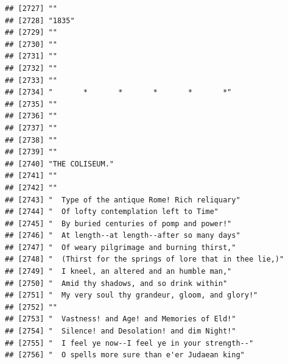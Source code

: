 \documentclass{article}\usepackage[]{graphicx}\usepackage[]{color}
\makeatletter
\newenvironment{kframe}{%
 \def\at@end@of@kframe{}%
 \ifinner\ifhmode%
  \def\at@end@of@kframe{\end{minipage}}%
  \begin{minipage}{\columnwidth}%
 \fi\fi%
 \def\FrameCommand##1{\hskip\@totalleftmargin \hskip-\fboxsep
 \colorbox{shadecolor}{##1}\hskip-\fboxsep
     \hskip-\linewidth \hskip-\@totalleftmargin \hskip\columnwidth}%
 \MakeFramed {\advance\hsize-\width
   \@totalleftmargin\z@ \linewidth\hsize
   \@setminipage}}%
 {\par\unskip\endMakeFramed%
 \at@end@of@kframe}
\newenvironment{knitrout}{}{} %
\makeatother
\begin{document}
\begin{knitrout}
\begin{kframe}
\begin{verbatim}
## [2727] ""                                                                            
## [2728] "1835"                                                                        
## [2729] ""                                                                            
## [2730] ""                                                                            
## [2731] ""                                                                            
## [2732] ""                                                                            
## [2733] ""                                                                            
## [2734] "       *       *       *       *       *"                                    
## [2735] ""                                                                            
## [2736] ""                                                                            
## [2737] ""                                                                            
## [2738] ""                                                                            
## [2739] ""                                                                            
## [2740] "THE COLISEUM."                                                               
## [2741] ""                                                                            
## [2742] ""                                                                            
## [2743] "  Type of the antique Rome! Rich reliquary"                                  
## [2744] "  Of lofty contemplation left to Time"                                       
## [2745] "  By buried centuries of pomp and power!"                                    
## [2746] "  At length--at length--after so many days"                                  
## [2747] "  Of weary pilgrimage and burning thirst,"                                   
## [2748] "  (Thirst for the springs of lore that in thee lie,)"                        
## [2749] "  I kneel, an altered and an humble man,"                                    
## [2750] "  Amid thy shadows, and so drink within"                                     
## [2751] "  My very soul thy grandeur, gloom, and glory!"                              
## [2752] ""                                                                            
## [2753] "  Vastness! and Age! and Memories of Eld!"                                   
## [2754] "  Silence! and Desolation! and dim Night!"                                   
## [2755] "  I feel ye now--I feel ye in your strength--"                               
## [2756] "  O spells more sure than e'er Judaean king"                                 

\end{verbatim}
\end{kframe}
\end{knitrout}
\end{document}

